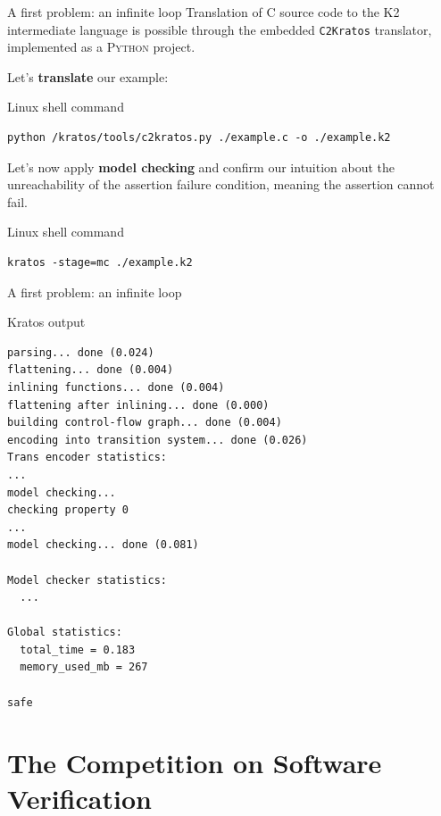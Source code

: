 \documentclass[aspectratio=1610,10.5pt]{beamer} %
\begin{document}
\begin{frame}[fragile]{A first problem: an infinite loop}
    Translation of C source code to the \textsc{K2} intermediate language is possible through the embedded \texttt{C2Kratos} translator, implemented as a \textsc{Python} project.

    \medskip

    Let's \textbf{translate} our example:

    \begin{block}{Linux shell command}
            \begin{verbatim}
python /kratos/tools/c2kratos.py ./example.c -o ./example.k2
            \end{verbatim}
    \end{block}

    \pause

    \bigskip

    Let's now apply \textbf{model checking} and confirm our intuition about the unreachability of the assertion failure condition, meaning the assertion cannot fail.

    \begin{block}{Linux shell command}
            \begin{verbatim}
kratos -stage=mc ./example.k2
            \end{verbatim}
    \end{block}
\end{frame}

\begin{frame}[fragile]{A first problem: an infinite loop}
    \begin{block}{Kratos output}
            \begin{verbatim}
parsing... done (0.024)
flattening... done (0.004)
inlining functions... done (0.004)
flattening after inlining... done (0.000)
building control-flow graph... done (0.004)
encoding into transition system... done (0.026)
Trans encoder statistics:
...
model checking...
checking property 0
...
model checking... done (0.081)

Model checker statistics:
  ...

Global statistics:
  total_time = 0.183
  memory_used_mb = 267

safe
            \end{verbatim}
    \end{block}
\end{frame}

\section{The Competition on Software Verification}
\end{document}
